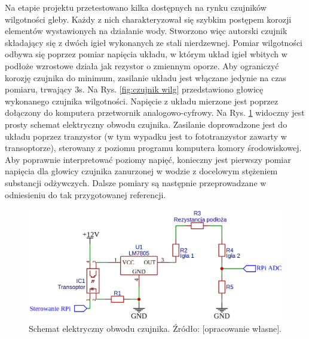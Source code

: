 Na etapie projektu przetestowano kilka dostępnych na rynku czujników wilgotności gleby. Każdy z nich charakteryzował się szybkim postępem korozji elementów wystawionych na działanie wody. Stworzono więc autorski czujnik składający się z dwóch igieł wykonanych ze stali nierdzewnej. Pomiar wilgotności odbywa się poprzez pomiar napięcia układu, w którym układ igieł wbitych w podłoże wzrostowe działa jak rezystor o zmiennym oporze. Aby ograniczyć korozję czujnika do minimum, zasilanie układu jest włączane jedynie na czas pomiaru, trwający 3s. Na Rys. \ref{fig:czujnik wilg} przedstawiono głowicę wykonanego czujnika wilgotności. Napięcie z układu mierzone jest poprzez dołączony do komputera przetwornik analogowo-cyfrowy. Na Rys. \ref{fig:czujnik wilg sch} widoczny jest prosty schemat elektryczny obwodu czujnika. Zasilanie doprowadzone jest do układu poprzez tranzystor (w tym wypadku jest to fototranzystor zawarty w transoptorze), sterowany z poziomu programu komputera komory środowiskowej. Aby poprawnie interpretować poziomy napięć, konieczny jest pierwszy pomiar napięcia dla głowicy czujnika zanurzonej w wodzie z docelowym stężeniem substancji odżywczych. Dalsze pomiary są następnie przeprowadzane w odniesieniu do tak przygotowanej referencji.

\begin{figure}[h]
	\centering
	\includegraphics[scale=.4]{schemat_wilg}
	\caption{Schemat elektryczny obwodu czujnika. Źródło: [opracowanie własne].} 
	\label{fig:czujnik wilg sch}
\end{figure}

